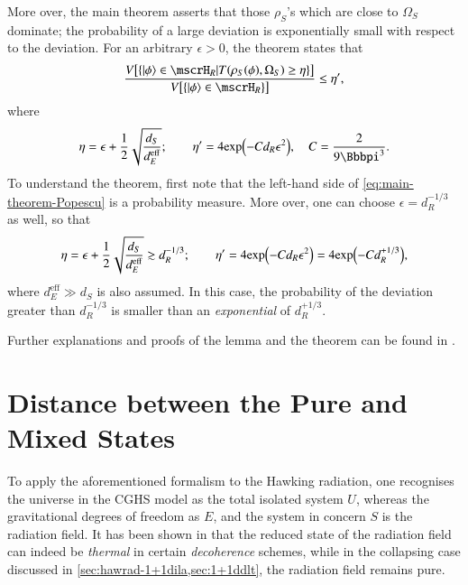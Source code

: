 More over, the main theorem asserts that those ${\rho}_S$'s which are close to 
${\Omega}_S$ dominate; the probability of a large deviation is exponentially 
small with respect to the deviation. For an arbitrary $\epsilon > 0$, the 
theorem states that
\begin{equation}
\frac{\sfun{V}{\cbr{\Ket{\phi} \in \mscrH_R |
\rfun{T}{\rfun{\rho_S}{\phi}, \Omega_S} \geq \eta}}}
{\sfun{V}{\cbr{\Ket{\phi} \in \mscrH_R}}} \leq \eta',
\label{eq:main-theorem-Popescu}
\end{equation}
where
\begin{equation}
\eta = \epsilon + \frac{1}{2}\sqrt{\frac{d_S}{d_E^\text{eff}}}; \qquad
\eta' = 4\rfun{\exp}{-C d_R \epsilon^2},\quad C = \frac{2}{9\pp^3}.
\label{eq:main-theorem-supp}
\end{equation}
To understand the theorem, first note that the left-hand side of 
\cref{eq:main-theorem-Popescu} is a probability measure. More over, one can 
choose $\epsilon = d_R^{-1/3}$ as well, so that
\begin{equation}
\eta = \epsilon + \frac{1}{2}\sqrt{\frac{d_S}{d_E^\text{eff}}} \gtrsim 
d_R^{-1/3};\qquad
\eta' = 4{\exp}\mathopen{}\left(-C d_R \epsilon^2\right)\mathclose{} = 4{\exp}\mathopen{}\left(-C d_R^{+1/3}\right)\mathclose{},
\end{equation}
where $d_E^\text{eff} \gg d_S$ is also assumed. In this case, the probability 
of the deviation greater than $d_R^{-1/3}$ is smaller than an 
\emph{exponential} of $d_R^{+1/3}$.

Further explanations and proofs of the lemma and the theorem can 
be found in \cite{Popescu2006,Popescu2007}.

\section{Distance between the Pure and Mixed States}
\label{sec:dist-radiation}

To apply the aforementioned formalism to the Hawking radiation, one recognises 
the universe in the CGHS model as the total isolated system $U$, whereas the 
gravitational degrees of freedom as $E$, and the system in concern $S$ is the 
radiation field. It has been shown in \cite{Demers1996,Kiefer2001} that the 
reduced state of the radiation field can indeed be \emph{thermal} in certain 
\emph{decoherence} schemes, while in the collapsing case discussed in 
\cref{sec:hawrad-1+1dila,sec:1+1ddlt}, the radiation field remains pure.

